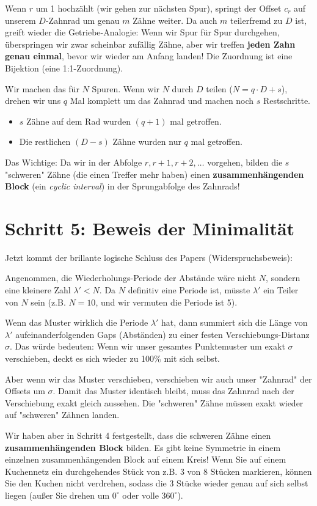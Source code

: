 \documentclass[11pt]{article}
\begin{document}
Wenn $r$ um 1 hochzählt (wir gehen zur nächsten Spur), springt der Offset $c_r$ auf unserem $D$-Zahnrad um genau $m$ Zähne weiter. 
Da auch $m$ teilerfremd zu $D$ ist, greift wieder die Getriebe-Analogie: Wenn wir Spur für Spur durchgehen, überspringen wir zwar scheinbar zufällig Zähne, aber wir treffen \textbf{jeden Zahn genau einmal}, bevor wir wieder am Anfang landen! Die Zuordnung ist eine Bijektion (eine 1:1-Zuordnung).

Wir machen das für $N$ Spuren. 
Wenn wir $N$ durch $D$ teilen ($N = q \cdot D + s$), drehen wir uns $q$ Mal komplett um das Zahnrad und machen noch $s$ Restschritte.
\begin{itemize}
    \item $s$ Zähne auf dem Rad wurden $(q+1)$ mal getroffen.
    \item Die restlichen $(D-s)$ Zähne wurden nur $q$ mal getroffen.
\end{itemize}
Das Wichtige: Da wir in der Abfolge $r, r+1, r+2, \dots$ vorgehen, bilden die $s$ "schweren" Zähne (die einen Treffer mehr haben) einen \textbf{zusammenhängenden Block} (ein \textit{cyclic interval}) in der Sprungabfolge des Zahnrads!

\section{Schritt 5: Beweis der Minimalität}

Jetzt kommt der brillante logische Schluss des Papers (Widerspruchsbeweis):

Angenommen, die Wiederholungs-Periode der Abstände wäre nicht $N$, sondern eine kleinere Zahl $\lambda' < N$. Da $N$ definitiv eine Periode ist, müsste $\lambda'$ ein Teiler von $N$ sein (z.B. $N=10$, und wir vermuten die Periode ist 5).

Wenn das Muster wirklich die Periode $\lambda'$ hat, dann summiert sich die Länge von $\lambda'$ aufeinanderfolgenden Gaps (Abständen) zu einer festen Verschiebungs-Distanz $\sigma$. Das würde bedeuten: Wenn wir unser gesamtes Punktemuster um exakt $\sigma$ verschieben, deckt es sich wieder zu 100\% mit sich selbst.

Aber wenn wir das Muster verschieben, verschieben wir auch unser "Zahnrad" der Offsets um $\sigma$.
Damit das Muster identisch bleibt, muss das Zahnrad nach der Verschiebung exakt gleich aussehen. Die "schweren" Zähne müssen exakt wieder auf "schweren" Zähnen landen.

Wir haben aber in Schritt 4 festgestellt, dass die schweren Zähne einen \textbf{zusammenhängenden Block} bilden. Es gibt keine Symmetrie in einem einzelnen zusammenhängenden Block auf einem Kreis! Wenn Sie auf einem Kuchennetz ein durchgehendes Stück von z.B. 3 von 8 Stücken markieren, können Sie den Kuchen nicht verdrehen, sodass die 3 Stücke wieder genau auf sich selbst liegen (außer Sie drehen um $0^\circ$ oder volle $360^\circ$).
\end{document}
